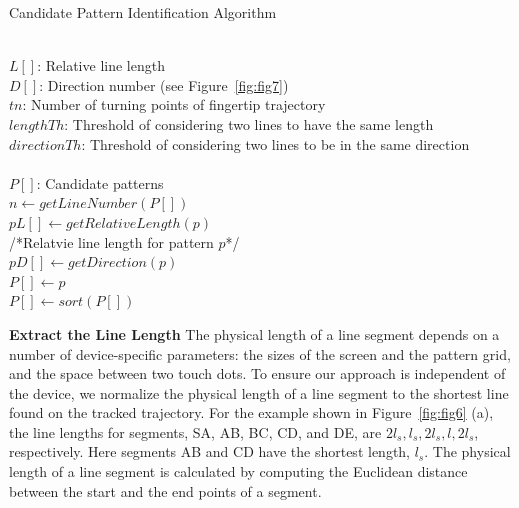 \renewcommand{\algorithmicforall}{\textbf{for each}}
    \begin{algorithm}[!t]
        \caption{Candidate Pattern Identification Algorithm}
        \label{alg:alg1}
        \begin{algorithmic}[1]
            \REQUIRE~~\\
                $L[]$: Relative line length \\
                $D[]$: Direction number (see Figure~\ref{fig:fig7}) \\
                $tn$: Number of turning points of fingertip trajectory \\
                $lengthTh$: Threshold of considering two lines to have the same length\\
                $directionTh$: Threshold of considering two lines to be in the same direction\\
            \ENSURE~~\\
                $P[]$: Candidate patterns \\

                \STATE $n \leftarrow getLineNumber(P[])$ \\
                \STATE $pL[]  \leftarrow getRelativeLength(p)$ \\
                /*Relatvie line length for pattern $p$*/ \\
                \STATE $pD[] \leftarrow getDirection(p)$ \\
                        \STATE $P[] \leftarrow p$\\
                    \ENDIF
                \ENDIF
            \ENDFOR
            \STATE $P[] \leftarrow sort(P[])$
        \end{algorithmic}
    \end{algorithm}
        \noindent \textbf{Extract the Line Length}
        The physical length of a line segment depends
        on a number of device-specific parameters: the sizes of the screen and the pattern grid, and the space between two touch dots.
        To ensure our approach is independent of the device, we normalize the physical length of a line segment to the
        shortest line found on the tracked trajectory. For the
        example shown in Figure~\ref{fig:fig6} (a), the line lengths for segments, SA, AB, BC, CD, and DE, are $2l_{s},l_{s},2l_{s},l,2l_{s}$, respectively.
        Here segments AB and CD have the shortest length, $l_s$. The physical length of a line segment is calculated by computing the
        Euclidean distance between the start and the end points of a segment.

